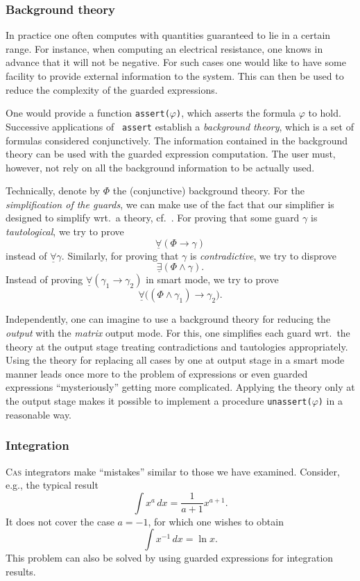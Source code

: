 \subsubsection{Background theory}\label{background}
In practice one often computes with quantities guaranteed to lie in a
certain range. For instance, when computing an electrical resistance,
one knows in advance that it will not be negative. For such cases one
would like to have some facility to provide external information to
the system. This can then be used to reduce the complexity of the
guarded expressions.

One would provide a function {\tt assert($\varphi$)}, which asserts
the formula {\tt $\varphi$} to hold. Successive applications of {\tt
assert} establish a {\em background theory}, which is a set of
formulas considered conjunctively. The information contained in the
background theory can be used with the guarded expression computation.
The user must, however, not rely on all the background information to
be actually used.

Technically, denote by $\Phi$ the (conjunctive) background theory. For
the {\em simplification of the guards}, we can make use of the fact
that our simplifier is designed to simplify wrt.~a theory,
cf.~\cite{Dolzmann:97b}. For proving that some guard $\gamma$ is
{\em tautological}, we try to prove
\[\underline{\forall}(\Phi\longrightarrow\gamma)\] instead of
$\underline{\forall}\gamma$. Similarly, for proving that $\gamma$ is
{\em contradictive}, we try to disprove
\[\underline{\exists}(\Phi\land\gamma).\] Instead of proving
$\underline{\forall}(\gamma_1\longrightarrow\gamma_2)$ in smart mode, we try to
prove
\[\underline{\forall}\bigl((\Phi\land\gamma_1)\longrightarrow\gamma_2\bigr).\]

Independently, one can imagine to use a background theory for reducing
the {\em output} with the {\em matrix} output mode. For this, one
simplifies each guard wrt.~the theory at the output stage treating
contradictions and tautologies appropriately. Using the theory for
replacing all cases by one at output stage in a smart mode manner
leads once more to the problem of expressions or even guarded
expressions ``mysteriously'' getting more complicated. Applying the
theory only at the output stage makes it possible to implement a
procedure {\tt unassert($\varphi$)} in a reasonable way.
%
\subsubsection{Integration}\label{integration}
\textsc{Cas} integrators make ``mistakes'' similar to those we have
examined. Consider, e.g., the typical result
\[
\int x^a\,dx=\frac{1}{a+1}x^{a+1}.
\]
It does not cover the case $a=-1$, for which one wishes to obtain
\[
\int x^{-1}\,dx=\ln x.
\]
This problem can also be solved by using guarded expressions for
integration results.

